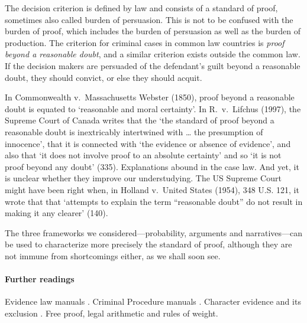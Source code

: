 \documentclass[10pt]{article}
\begin{document}
The decision criterion is defined by law 
and consists of a standard of proof, sometimes also called burden of persuasion. This is not to be confused with 
the burden of proof, which includes the burden of persuasion as well as the burden of production.
The criterion for criminal cases in common law countries is 
\textit{proof beyond a reasonable doubt}, and a similar criterion exists outside the common law.
 If the decision makers are persuaded of the defendant's guilt beyond a reasonable doubt, 
 they should convict, or else they should acquit.  

In Commonwealth v.\ Massachusetts Webster (1850), 
proof beyond a reasonable doubt is equated to 
`reasonable and moral certainty'. In R.\ v.\ Lifchus (1997),  the Supreme Court of Canada writes that 
the `the standard of proof beyond a reasonable 
doubt is inextricably intertwined with \dots 
the presumption of innocence', that it is connected with `the evidence or  
absence of evidence', and also that `it does not involve proof to an absolute certainty' and so 
`it is not proof beyond any doubt' (335). 
Explanations abound in the case law. And yet, it is unclear 
whether they improve our understudying. The US Supreme Court might have been right when, in Holland v.\ United States (1954), 348 U.S. 121, 
it wrote that that `attempts to explain the term ``reasonable doubt'' do not result in making it any clearer' (140).
 
 
The three frameworks we considered---probability, arguments and narratives---can be used to characterize 
more precisely the standard of proof, although they are not immune from shortcomings either, 
as we shall soon see.


\paragraph{Further readings}
Evidence law manuals  \citep{fisher2008,  mendez2008}. 
Criminal Procedure manuals \citep{allenEtAl2011}.
Character evidence and its exclusion \citep{redmayne2015}.
Free proof, legal arithmetic and rules of weight.
 

 
 
\end{document}

